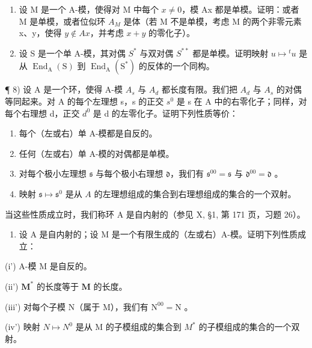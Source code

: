 \begin{enumerate}
\def\labelenumi{\arabic{enumi})}
\setcounter{enumi}{5}
\item
  设 M 是一个 A-模，使得对 M 中每个 \(x \neq 0\)，模 Ax 都是单模。证明：或者 M 是单模，或者位似环 \(A_{M}\) 是体（若 M 不是单模，考虑 M 的两个非零元素 x、y，使得 \(y \notin Ax\)，并考虑 \(x + y\) 的零化子）。
\item
  设 S 是一个单 A-模，其对偶 \(S^{*}\) 与双对偶 \(S^{**}\) 都是单模。证明映射 \(u \mapsto {}^{t}u\) 是从 \(\operatorname{End}_{\mathrm{A}}(\mathrm{S})\) 到 \(\operatorname{End}_{\mathrm{A}}(\mathrm{S}^{*})\) 的反体的一个同构。
\end{enumerate}

¶ 8) 设 A 是一个环，使得 A-模 \(A_{s}\) 与 \(A_{d}\) 都长度有限。我们把 \(A_{d}\) 与 \(A_{s}\) 的对偶等同起来。对 A 的每个左理想 s，s 的正交 \(s^{0}\) 是 s 在 A 中的右零化子；同样，对每个右理想 d，正交 \(d^{0}\) 是 d 的左零化子。证明下列性质等价：

\begin{enumerate}
\def\labelenumi{(\roman{enumi})}
\item
  每个（左或右）单 A-模都是自反的。
\item
  任何（左或右）单 A-模的对偶都是单模。
\item
  对每个极小左理想 \(\mathfrak{s}\) 与每个极小右理想 \(\mathfrak{d}\)，我们有 \(\mathfrak{s}^{00} = \mathfrak{s}\) 与 \(\mathfrak{d}^{00} = \mathfrak{d}\) 。
\item
  映射 \(\mathfrak{s} \mapsto \mathfrak{s}^0\) 是从 \(A\) 的左理想组成的集合到右理想组成的集合的一个双射。
\end{enumerate}

当这些性质成立时，我们称环 A 是自内射的（参见 X, §1, 第 171 页，习题 26）。

\begin{enumerate}
\def\labelenumi{\alph{enumi})}
\tightlist
\item
  设 A 是自内射的；设 M 是一个有限生成的（左或右）A-模。证明下列性质成立：
\end{enumerate}

(i') A-模 M 是自反的。

(ii') \(\mathbf{M}^*\) 的长度等于 \(\mathbf{M}\) 的长度。

(iii') 对每个子模 \(\mathrm{N}\)（属于 \(\mathrm{M}\)），我们有 \(\mathrm{N}^{00} = \mathrm{N}\) 。

(iv') 映射 \(N \mapsto N^{0}\) 是从 M 的子模组成的集合到 \(M^{*}\) 的子模组成的集合的一个双射。

